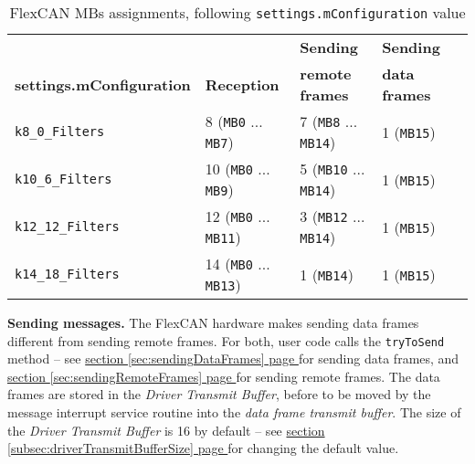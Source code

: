 \documentclass[10pt, a4paper, obeyspaces, openany]{extarticle}
\newcommand\refSectionPage[1]{\hyperref[sec:#1]{section \ref*{sec:#1} page \pageref{sec:#1}}}
\newcommand\refSubsectionPage[1]{\hyperref[subsec:#1]{section \ref*{subsec:#1} page \pageref{subsec:#1}}}
\newcommand\labelTableau[1]{\label{tab:#1}}
\begin{document}
\begin{table}[!ht]
  \small
  \onehalfspacing
  \centering
  \begin{tabular}{lllll}
     & & \textbf{Sending} & \textbf{Sending} \\
    \textbf{settings.mConfiguration}& \textbf{Reception} & \textbf{remote frames} & \textbf{data frames} \\
    \texttt{k8\_0\_Filters} & 8 (\texttt{MB0} ... \texttt{MB7}) & 7 (\texttt{MB8} ... \texttt{MB14}) & 1 (\texttt{MB15})\\
    \texttt{k10\_6\_Filters} & 10  (\texttt{MB0} ... \texttt{MB9}) & 5  (\texttt{MB10} ... \texttt{MB14})& 1 (\texttt{MB15})\\
    \texttt{k12\_12\_Filters} & 12  (\texttt{MB0} ... \texttt{MB11}) & 3  (\texttt{MB12} ... \texttt{MB14}) & 1 (\texttt{MB15})\\
    \texttt{k14\_18\_Filters} & 14  (\texttt{MB0} ... \texttt{MB13}) & 1 (\texttt{MB14}) & 1 (\texttt{MB15})\\
  \end{tabular}
  \caption{FlexCAN MBs assignments, following \texttt{settings.mConfiguration} value}
  \labelTableau{MBassignement}
\end{table}




{\bf Sending messages.} The FlexCAN hardware makes sending data frames different from sending remote frames. For both, user code calls the \texttt{tryToSend} method -- see \refSectionPage{sendingDataFrames} for sending data frames, and \refSectionPage{sendingRemoteFrames} for sending remote frames. The data frames are stored in the \emph{Driver Transmit Buffer}, before to be moved by the message interrupt service routine into the \emph{data frame transmit buffer}. The size of the \emph{Driver Transmit Buffer} is 16 by default -- see \refSubsectionPage{driverTransmitBufferSize} for changing the default value.
\end{document}
